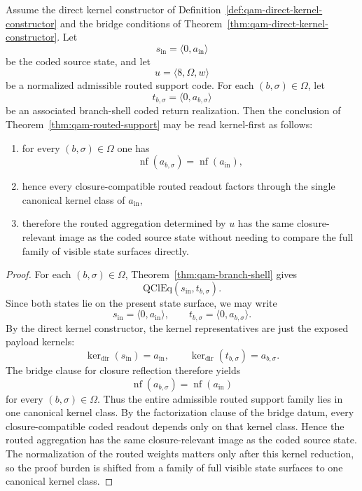 \begin{proposition}\label{prop:qam-kernel-first-routed}
Assume the direct kernel constructor of Definition~\ref{def:qam-direct-kernel-constructor} and the bridge conditions of Theorem~\ref{thm:qam-direct-kernel-constructor}. Let
\[
s_{\mathrm{in}}=\langle 0,a_{\mathrm{in}}\rangle
\]
be the coded source state, and let
\[
u=\langle 8,\Omega,w\rangle
\]
be a normalized admissible routed support code. For each $(b,\sigma)\in\Omega$, let
\[
t_{b,\sigma}=\langle 0,a_{b,\sigma}\rangle
\]
be an associated branch-shell coded return realization. Then the conclusion of Theorem~\ref{thm:qam-routed-support} may be read kernel-first as follows:
\begin{enumerate}
\item for every $(b,\sigma)\in\Omega$ one has
\[
\operatorname{nf}(a_{b,\sigma})=\operatorname{nf}(a_{\mathrm{in}}),
\]
\item hence every closure-compatible routed readout factors through the single canonical kernel class of $a_{\mathrm{in}}$,
\item therefore the routed aggregation determined by $u$ has the same closure-relevant image as the coded source state without needing to compare the full family of visible state surfaces directly.
\end{enumerate}
\end{proposition}

\begin{proof}
For each $(b,\sigma)\in\Omega$, Theorem~\ref{thm:qam-branch-shell} gives
\[
\mathrm{QClEq}(s_{\mathrm{in}},t_{b,\sigma}).
\]
Since both states lie on the present state surface, we may write
\[
s_{\mathrm{in}}=\langle 0,a_{\mathrm{in}}\rangle,
\qquad
 t_{b,\sigma}=\langle 0,a_{b,\sigma}\rangle.
\]
By the direct kernel constructor, the kernel representatives are just the exposed payload kernels:
\[
\operatorname{ker}_{\mathrm{dir}}(s_{\mathrm{in}})=a_{\mathrm{in}},
\qquad
\operatorname{ker}_{\mathrm{dir}}(t_{b,\sigma})=a_{b,\sigma}.
\]
The bridge clause for closure reflection therefore yields
\[
\operatorname{nf}(a_{b,\sigma})=\operatorname{nf}(a_{\mathrm{in}})
\]
for every $(b,\sigma)\in\Omega$. Thus the entire admissible routed support family lies in one canonical kernel class. By the factorization clause of the bridge datum, every closure-compatible coded readout depends only on that kernel class. Hence the routed aggregation has the same closure-relevant image as the coded source state. The normalization of the routed weights matters only after this kernel reduction, so the proof burden is shifted from a family of full visible state surfaces to one canonical kernel class.
\end{proof}

